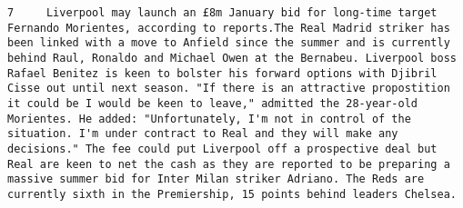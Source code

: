 \documentclass[11pt]{article}
\begin{document}
\begin{Verbatim}[commandchars=\\\{\}]
         7     Liverpool may launch an £8m January bid for long-time target Fernando Morientes, according to reports.The Real Madrid striker has been linked with a move to Anfield since the summer and is currently behind Raul, Ronaldo and Michael Owen at the Bernabeu. Liverpool boss Rafael Benitez is keen to bolster his forward options with Djibril Cisse out until next season. "If there is an attractive propostition it could be I would be keen to leave," admitted the 28-year-old Morientes. He added: "Unfortunately, I'm not in control of the situation. I'm under contract to Real and they will make any decisions." The fee could put Liverpool off a prospective deal but Real are keen to net the cash as they are reported to be preparing a massive summer bid for Inter Milan striker Adriano. The Reds are currently sixth in the Premiership, 15 points behind leaders Chelsea.                                                                                                                                                                                                                                                                                                                                                                                                                                                                                                                                                                                                                                                                                                                                                                                                                                                                                                                                                                                                                                                                                                                                                                                                                                                                                                                                                                                                                                                                                                                                                                                                                                                                                                                                                                                                                                                                                                                                                                                                                                                                                                                                                                                                                                                                                                                                                                                                                                                                                                                    
\end{Verbatim}
\end{document}
